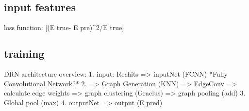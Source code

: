 
\subsection{input features}


loss function:  [(E true- E pre)^2/E true] %


\subsection{training}


DRN architecture overview:
1. input: Rechits => inputNet (FCNN) *Fully Convolutional Network?*
2. => Graph Generation (KNN) => EdgeConv => calculate edge weights => graph clustering (Graclus) => graph pooling (add)
3. Global pool (max)
4. outputNet => output (E pred)

